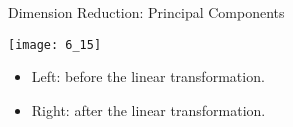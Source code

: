 \documentclass[mathserif, aspectratio=169]{beamer}
\begin{document}
\begin{frame}{Dimension Reduction: Principal Components}
	\vspace{-8mm}
	\begin{center}
		\texttt{[image: 6\_15]}
	\end{center}
	\vspace{-6mm}
	\begin{itemize}
		\item Left: before the linear transformation.
		\item Right: after the linear transformation.
	\end{itemize}
\end{frame}
\end{document}
